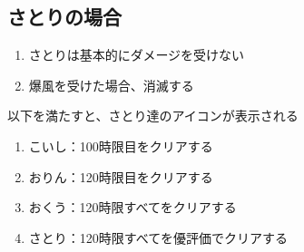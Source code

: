 \subsection{さとりの場合}
\begin{enumerate}[label={\sarrow}]
\item さとりは基本的にダメージを受けない
\item 爆風を受けた場合、消滅する
\end{enumerate}



以下を満たすと、さとり達のアイコンが表示される
\begin{enumerate}[label={\sarrow}]
\item こいし：100時限目をクリアする
\item おりん：120時限目をクリアする
\item おくう：120時限すべてをクリアする
\item さとり：120時限すべてを優評価でクリアする
\end{enumerate}



\begin{appendices}
\end{appendices}

